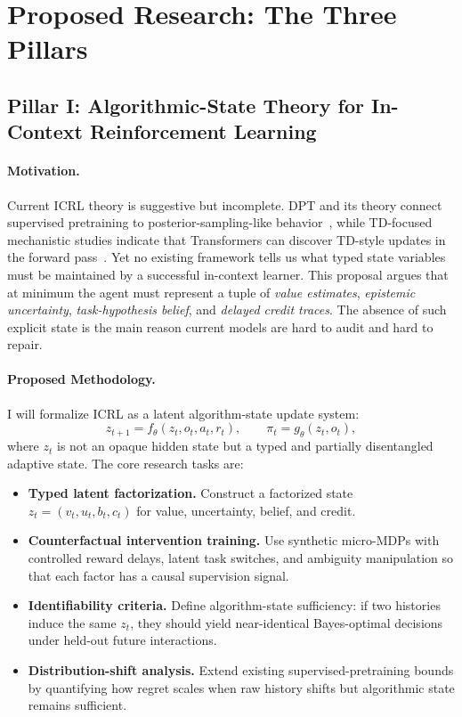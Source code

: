 \documentclass[10pt,twocolumn,letterpaper]{article}
\begin{document}
\section{Proposed Research: The Three Pillars}
\subsection{Pillar I: Algorithmic-State Theory for In-Context Reinforcement Learning}
\paragraph{Motivation.}
Current ICRL theory is suggestive but incomplete. DPT and its theory connect supervised pretraining to posterior-sampling-like behavior~\cite{lee2023dpt,lin2023decisionmakers}, while TD-focused mechanistic studies indicate that Transformers can discover TD-style updates in the forward pass~\cite{wang2024td,demircan2024sae}. Yet no existing framework tells us what typed state variables must be maintained by a successful in-context learner. This proposal argues that at minimum the agent must represent a tuple of \emph{value estimates}, \emph{epistemic uncertainty}, \emph{task-hypothesis belief}, and \emph{delayed credit traces}. The absence of such explicit state is the main reason current models are hard to audit and hard to repair.

\paragraph{Proposed Methodology.}
I will formalize ICRL as a latent algorithm-state update system:
\[
z_{t+1} = f_{\theta}(z_t, o_t, a_t, r_t), \qquad \pi_t = g_{\theta}(z_t, o_t),
\]
where \(z_t\) is not an opaque hidden state but a typed and partially disentangled adaptive state. The core research tasks are:
\begin{itemize}[leftmargin=1.2em]
\item \textbf{Typed latent factorization.} Construct a factorized state \(z_t = (v_t, u_t, b_t, c_t)\) for value, uncertainty, belief, and credit.
\item \textbf{Counterfactual intervention training.} Use synthetic micro-MDPs with controlled reward delays, latent task switches, and ambiguity manipulation so that each factor has a causal supervision signal.
\item \textbf{Identifiability criteria.} Define algorithm-state sufficiency: if two histories induce the same \(z_t\), they should yield near-identical Bayes-optimal decisions under held-out future interactions.
\item \textbf{Distribution-shift analysis.} Extend existing supervised-pretraining bounds by quantifying how regret scales when raw history shifts but algorithmic state remains sufficient.
\end{itemize}
\end{document}
